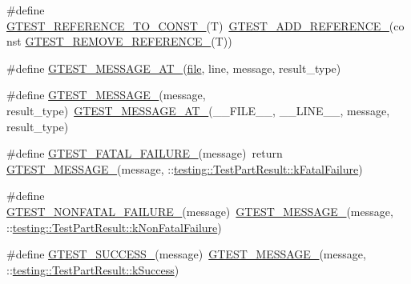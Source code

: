\begin{DoxyCompactItemize}
\item 
\#define \hyperlink{gtest-internal_8h_a9f91fcd24cae0b48fdaeb19102dac525}{G\+T\+E\+S\+T\+\_\+\+R\+E\+F\+E\+R\+E\+N\+C\+E\+\_\+\+T\+O\+\_\+\+C\+O\+N\+S\+T\+\_\+}(T)~\hyperlink{gtest-internal_8h_ab389953fc1f7e4efae30d182a0e0a13b}{G\+T\+E\+S\+T\+\_\+\+A\+D\+D\+\_\+\+R\+E\+F\+E\+R\+E\+N\+C\+E\+\_\+}(const \hyperlink{gtest-internal_8h_a84c72f25a6a6600e3ff8381ca6982ae9}{G\+T\+E\+S\+T\+\_\+\+R\+E\+M\+O\+V\+E\+\_\+\+R\+E\+F\+E\+R\+E\+N\+C\+E\+\_\+}(T))
\item 
\#define \hyperlink{gtest-internal_8h_a8d70025c45a47a493780746dfd66d565}{G\+T\+E\+S\+T\+\_\+\+M\+E\+S\+S\+A\+G\+E\+\_\+\+A\+T\+\_\+}(\hyperlink{_07copy_08_2_read_camera_model_8m_a151631b2fd2bb776ef06c9f440a7ed74}{file},  line,  message,  result\+\_\+type)
\item 
\#define \hyperlink{gtest-internal_8h_a94c73d5368ec946bc354d0992ad00810}{G\+T\+E\+S\+T\+\_\+\+M\+E\+S\+S\+A\+G\+E\+\_\+}(message,  result\+\_\+type)~\hyperlink{gtest-internal_8h_a8d70025c45a47a493780746dfd66d565}{G\+T\+E\+S\+T\+\_\+\+M\+E\+S\+S\+A\+G\+E\+\_\+\+A\+T\+\_\+}(\+\_\+\+\_\+\+F\+I\+L\+E\+\_\+\+\_\+, \+\_\+\+\_\+\+L\+I\+N\+E\+\_\+\+\_\+, message, result\+\_\+type)
\item 
\#define \hyperlink{gtest-internal_8h_a0f9a4c3ea82cc7bf4478eaffdc168358}{G\+T\+E\+S\+T\+\_\+\+F\+A\+T\+A\+L\+\_\+\+F\+A\+I\+L\+U\+R\+E\+\_\+}(message)~return \hyperlink{gtest-internal_8h_a94c73d5368ec946bc354d0992ad00810}{G\+T\+E\+S\+T\+\_\+\+M\+E\+S\+S\+A\+G\+E\+\_\+}(message, \+::\hyperlink{classtesting_1_1_test_part_result_a65ae656b33fdfdfffaf34858778a52d5ae1bf0b610b697a43fee97628cdab4ea1}{testing\+::\+Test\+Part\+Result\+::k\+Fatal\+Failure})
\item 
\#define \hyperlink{gtest-internal_8h_a6cb7482cfa03661a91c698eb5895f642}{G\+T\+E\+S\+T\+\_\+\+N\+O\+N\+F\+A\+T\+A\+L\+\_\+\+F\+A\+I\+L\+U\+R\+E\+\_\+}(message)~\hyperlink{gtest-internal_8h_a94c73d5368ec946bc354d0992ad00810}{G\+T\+E\+S\+T\+\_\+\+M\+E\+S\+S\+A\+G\+E\+\_\+}(message, \+::\hyperlink{classtesting_1_1_test_part_result_a65ae656b33fdfdfffaf34858778a52d5a00a755614f8ec3f78b2e951f8c91cd92}{testing\+::\+Test\+Part\+Result\+::k\+Non\+Fatal\+Failure})
\item 
\#define \hyperlink{gtest-internal_8h_abe012b550eb3807e8c49f7e161bd1567}{G\+T\+E\+S\+T\+\_\+\+S\+U\+C\+C\+E\+S\+S\+\_\+}(message)~\hyperlink{gtest-internal_8h_a94c73d5368ec946bc354d0992ad00810}{G\+T\+E\+S\+T\+\_\+\+M\+E\+S\+S\+A\+G\+E\+\_\+}(message, \+::\hyperlink{classtesting_1_1_test_part_result_a65ae656b33fdfdfffaf34858778a52d5a8fa3d06b2baad8bf7c1f17dea314983e}{testing\+::\+Test\+Part\+Result\+::k\+Success})

\end{DoxyCompactItemize}
